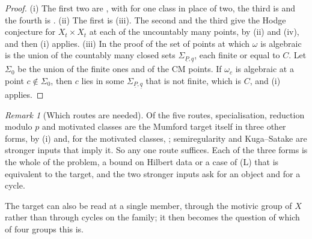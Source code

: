 \documentclass[11pt,reqno]{amsart}
\theoremstyle{plain}
\theoremstyle{definition}
\theoremstyle{remark}
\newtheorem{remark}[theorem]{Remark}
\begin{document}
\begin{proof}
(i) The first two are , with 
for one class in place of two, the third is  and the
fourth is . (ii) The first is
(iii). The second and the third give the Hodge
conjecture for $X_{t}\times X_{t}$ at each of the uncountably many points, by
(ii) and (iv), and then (i) applies.
(iii) In the proof of  the set of points at which
$\omega$ is algebraic is the union of the countably many closed sets
$\Sigma_{\underline{P},\underline{q}}$, each finite or equal to $C$. Let
$\Sigma_{0}$ be the union of the finite ones and of the CM points. If
$\omega_{c}$ is algebraic at a point $c\notin\Sigma_{0}$, then $c$ lies in
some $\Sigma_{\underline{P},\underline{q}}$ that is not finite, which is $C$,
and (i) applies.
\end{proof}

\begin{remark}[Which routes are needed]\label{rem:mumfordneeded}
Of the five routes, specialisation, reduction modulo $p$ and motivated
classes are the Mumford target itself in three other forms, by
(i) and, for the motivated classes,
; semiregularity and Kuga--Satake are stronger inputs
that imply it. So any one route suffices. Each of the three
forms is the whole of the problem, a bound on Hilbert data or a case of
\textup{(L)} that is equivalent to the target, and the two stronger inputs
ask for an object and for a cycle.
\end{remark}

The target can also be read at a single member, through the motivic group of
$X$ rather than through cycles on the family; it then becomes the question of
which of four groups this is.
\end{document}
